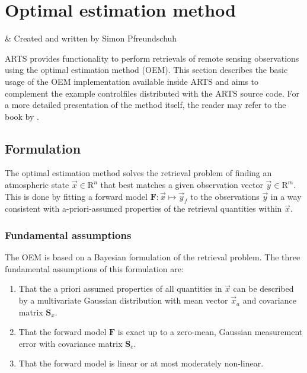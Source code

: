 \graphicspath{{Figs/retrievals/}}

\chapter{Optimal estimation method}
 \label{sec:oem}

 & Created and written by Simon Pfreundschuh\\ 
\stophistory

ARTS provides functionality to perform retrievals of remote sensing
observations using the optimal estimation method (OEM). This section 
describes the basic usage of the OEM implementation available inside ARTS
and aims to complement the example controlfiles distributed with the
ARTS source code. For a more detailed presentation of the method itself,
the reader may refer to the book by \citet{rodgers:00}.

\section{Formulation}

The optimal estimation method solves the retrieval problem of finding an
atmospheric state $\vec{x} \in \mathrm{R}^n$ that best matches a given observation
vector $\vec{y} \in \mathrm{R}^m$. This is done by fitting a forward model
$\mathbf{F}: \vec{x} \mapsto \vec{y}_f$ to the observations $\vec{y}$ in a way
consistent with a-priori-assumed properties of the retrieval quantities
within $\vec{x}$.

\subsection{Fundamental assumptions}

The OEM is based on a Bayesian formulation of the retrieval problem.
The three fundamental assumptions of this formulation are:
\begin{enumerate}
\item That the a priori assumed properties of all quantities in $\vec{x}$ can be described by
 a multivariate Gaussian distribution with mean vector $\vec{x}_a$ and covariance
 matrix $\mathbf{S}_x$.
\item That the forward model $\mathbf{F}$ is exact up to a zero-mean, Gaussian measurement
      error with covariance matrix $\mathbf{S}_e$.
\item That the forward model is linear or at most moderately non-linear.
\end{enumerate}

